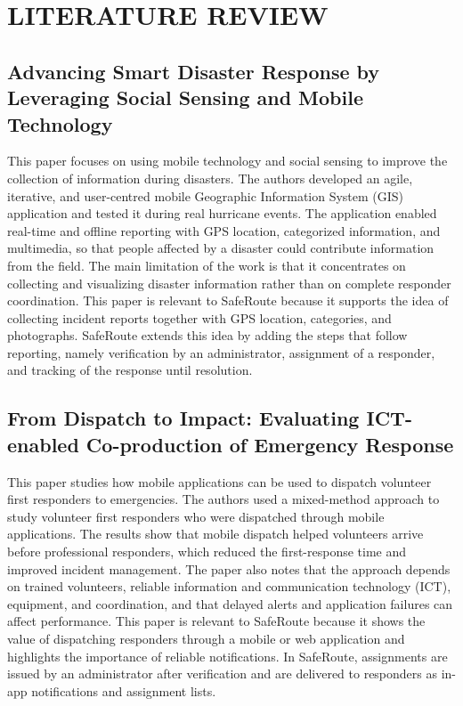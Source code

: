 \documentclass[a4paper,12pt]{report}
\begin{document}
	\chapter{LITERATURE REVIEW}
	
	\section{Advancing Smart Disaster Response by Leveraging Social Sensing and Mobile Technology}
	
	\hspace{1cm}This paper focuses on using mobile technology and social sensing to improve the collection of information during disasters. The authors developed an agile, iterative, and user-centred mobile Geographic Information System (GIS) application and tested it during real hurricane events. The application enabled real-time and offline reporting with GPS location, categorized information, and multimedia, so that people affected by a disaster could contribute information from the field. The main limitation of the work is that it concentrates on collecting and visualizing disaster information rather than on complete responder coordination. This paper is relevant to SafeRoute because it supports the idea of collecting incident reports together with GPS location, categories, and photographs. SafeRoute extends this idea by adding the steps that follow reporting, namely verification by an administrator, assignment of a responder, and tracking of the response until resolution.~\cite{one}
	
	\vspace{0.5cm}
	\section{From Dispatch to Impact: Evaluating ICT-enabled Co-production of Emergency Response}
	
	\hspace{1cm}This paper studies how mobile applications can be used to dispatch volunteer first responders to emergencies. The authors used a mixed-method approach to study volunteer first responders who were dispatched through mobile applications. The results show that mobile dispatch helped volunteers arrive before professional responders, which reduced the first-response time and improved incident management. The paper also notes that the approach depends on trained volunteers, reliable information and communication technology (ICT), equipment, and coordination, and that delayed alerts and application failures can affect performance. This paper is relevant to SafeRoute because it shows the value of dispatching responders through a mobile or web application and highlights the importance of reliable notifications. In SafeRoute, assignments are issued by an administrator after verification and are delivered to responders as in-app notifications and assignment lists.~\cite{two}
	
\end{document}
